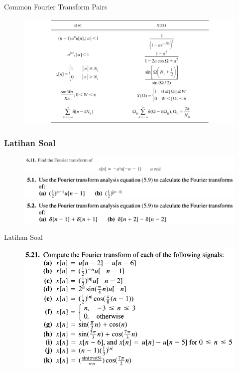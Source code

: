\documentclass[pdflatex,compress,mathserif]{beamer}
\begin{document}
\begin{frame}{Common Fourier Transform Pairs}
	\begin{figure}
		\centering
		\includegraphics[width=\linewidth]{img/img22}
		\includegraphics[width=\linewidth]{img/img23}
	\end{figure}
\end{frame}

\begin{frame}
	\frametitle{Latihan Soal}
	\begin{figure}
		\centering
		\includegraphics[width=\linewidth]{img/img24}
		\includegraphics[width=\linewidth]{img/img25}		\includegraphics[width=\linewidth]{img/img26}
	\end{figure}
\end{frame}

\begin{frame}{Latihan Soal}
	\begin{figure}
		\centering
		\includegraphics[width=\linewidth]{img/img27}
	\end{figure}
\end{frame}
\end{document}
